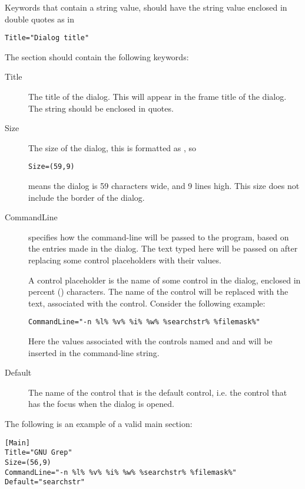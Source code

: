 \begin{remark}
Keywords that contain a string value, should have the string value enclosed
in double quotes as in
\begin{verbatim}
Title="Dialog title"
\end{verbatim}
\end{remark}

The  section should contain the following keywords:
\begin{description}
\item[Title] The title of the dialog. This will appear in the frame title of the dialog.
The string should be enclosed in quotes.
\item[Size] The size of the dialog, this is formatted as , so
\begin{verbatim}
Size=(59,9)
\end{verbatim}
means the dialog is 59 characters wide, and 9 lines high. This size does not include
the border of the dialog.
\item[CommandLine] specifies how the command-line will be passed to the
program, based on the entries made in the dialog. The text typed here will be passed
on after replacing some control placeholders with their values.

A control placeholder is the name of some control in the dialog, enclosed in
percent (\var{\%}) characters. The name of the control will be replaced with
the text, associated with the control. Consider the following example:
\begin{verbatim}
CommandLine="-n %l% %v% %i% %w% %searchstr% %filemask%"
\end{verbatim}
Here the values associated with the controls named  and
 and  will be inserted in the command-line
string.
\item[Default]
The name of the control that is the default control, i.e. the control
that has the focus when the dialog is opened.
\end{description}
The following is an example of a valid main section:
\begin{verbatim}
[Main]
Title="GNU Grep"
Size=(56,9)
CommandLine="-n %l% %v% %i% %w% %searchstr% %filemask%"
Default="searchstr"
\end{verbatim}

